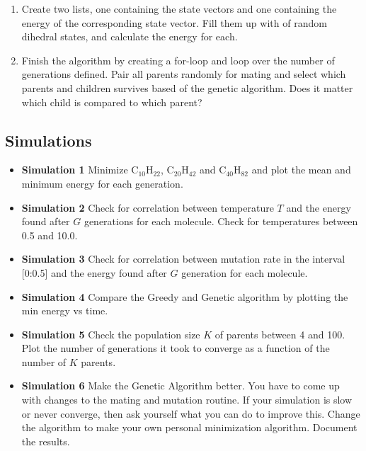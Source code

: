 \documentclass{article}
\begin{document}
\begin{enumerate}
    \item Create two lists, one containing the state vectors
    and one containing the energy of the corresponding state vector.
    Fill them up with  of random dihedral states,
    and calculate the energy for each.

    \item Finish the algorithm by creating a for-loop and loop over the number of generations defined.
          Pair all parents randomly for mating and select which parents and children survives based of the genetic algorithm.
          Does it matter which child is compared to which parent?



\end{enumerate}


\subsection{Simulations}

\begin{itemize}
    \item {\bf Simulation 1}\newline
      Minimize
      C$_{10}$H$_{22}$,
      C$_{20}$H$_{42}$ and
      C$_{40}$H$_{82}$
      and plot the mean and minimum energy for
      each generation.

    \item {\bf Simulation 2}\newline
      Check for correlation between temperature $T$ and the energy found after $G$ generations for each molecule.
      Check for temperatures between 0.5 and 10.0.

    \item {\bf Simulation 3}\newline
      Check for correlation between mutation rate in the interval [0:0.5] and the energy found after $G$ generation for each molecule.

    \item {\bf Simulation 4}\newline
      Compare the Greedy and Genetic algorithm by plotting the min energy vs time.

    \item {\bf Simulation 5}\newline
      Check the population size $K$ of parents between 4 and 100.
      Plot the number of generations it took to converge as a function of the number of $K$ parents.

    \item {\bf Simulation 6}\newline
      Make the Genetic Algorithm better.
      You have to come up with changes to the mating and mutation routine.
      If your simulation is slow or never converge, then ask yourself what you can do to improve this.
      Change the algorithm to make your own personal minimization algorithm.
      Document the results.


\end{itemize}



\end{document}
